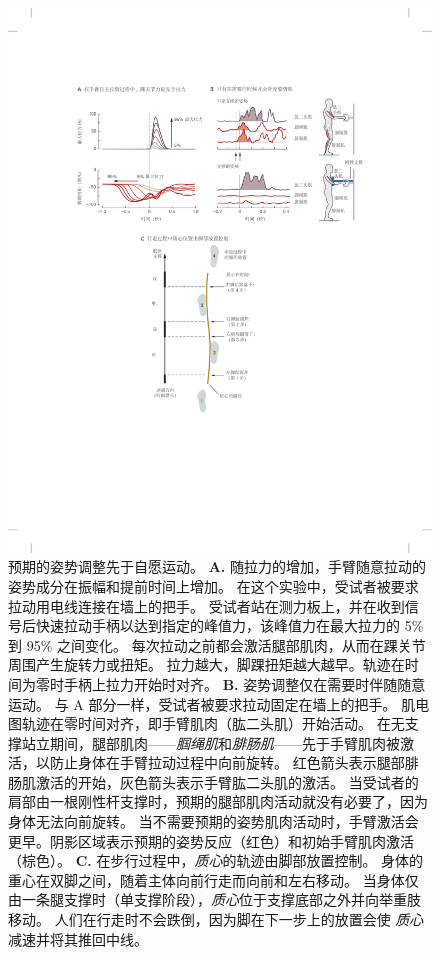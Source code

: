 \begin{figure}[htbp]
	\centering
	\includegraphics[width=1.0\linewidth]{chap36/fig_36_8}
	\caption{预期的姿势调整先于自愿运动。
		\textbf{A.} 随拉力的增加，手臂随意拉动的姿势成分在振幅和提前时间上增加。
		在这个实验中，受试者被要求拉动用电线连接在墙上的把手。
		受试者站在测力板上，并在收到信号后快速拉动手柄以达到指定的峰值力，该峰值力在最大拉力的 5\% 到 95\% 之间变化。
		每次拉动之前都会激活腿部肌肉，从而在踝关节周围产生旋转力或扭矩。
		拉力越大，脚踝扭矩越大越早。轨迹在时间为零时手柄上拉力开始时对齐\cite{lee1990organization}。
		\textbf{B.} 姿势调整仅在需要时伴随随意运动。
		与 A 部分一样，受试者被要求拉动固定在墙上的把手。
		肌电图轨迹在零时间对齐，即手臂肌肉（肱二头肌）开始活动。
		在无支撑站立期间，腿部肌肉——\textit{腘绳肌}和\textit{腓肠肌}——先于手臂肌肉被激活，以防止身体在手臂拉动过程中向前旋转。
		红色箭头表示腿部腓肠肌激活的开始，灰色箭头表示手臂肱二头肌的激活。
		当受试者的肩部由一根刚性杆支撑时，预期的腿部肌肉活动就没有必要了，因为身体无法向前旋转。
		当不需要预期的姿势肌肉活动时，手臂激活会更早。阴影区域表示预期的姿势反应（红色）和初始手臂肌肉激活（棕色）\cite{cordo1982properties}。
		\textbf{C.} 在步行过程中，\textit{质心}的轨迹由脚部放置控制。
		身体的重心在双脚之间，随着主体向前行走而向前和左右移动。
		当身体仅由一条腿支撑时（单支撑阶段），\textit{质心}位于支撑底部之外并向举重肢移动。
		人们在行走时不会跌倒，因为脚在下一步上的放置会使 \textit{质心}减速并将其推回中线\cite{mackinnon1993control}。}
	\label{fig:36_8}
\end{figure}


